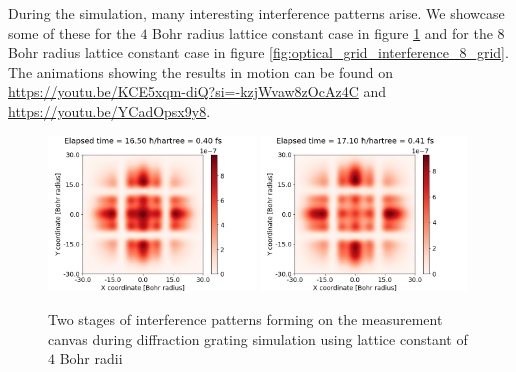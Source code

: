 During the simulation, many interesting interference patterns arise.
We showcase some of these for the $4$ Bohr radius lattice constant case in figure \ref{fig:optical_grid_interference} and for the $8$ Bohr radius lattice constant case in figure \ref{fig:optical_grid_interference_8_grid}.
The animations showing the results in motion can be found on \url{https://youtu.be/KCE5xqm-diQ?si=-kzjWvaw8zOcAz4C} and \url{https://youtu.be/YCadOpsx9y8}.
\begin{figure}[hbt!]
	\begin{center}
		\includegraphics[width=0.49\textwidth]{figures/optical_grid_interference_01.png}
		\includegraphics[width=0.49\textwidth]{figures/optical_grid_interference_02.png}
		\caption{Two stages of interference patterns forming on the measurement canvas during diffraction grating simulation using lattice constant of $4$ Bohr radii}
		\label{fig:optical_grid_interference}
	\end{center}	
\end{figure}
